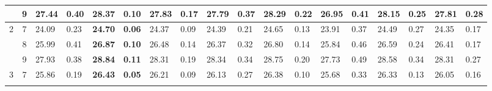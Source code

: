 \documentclass[conference]{IEEEtran}
\begin{document}
\begin{table}[t]
\begin{tabular}{|cc|ll|ll|ll|ll|ll|ll|ll|ll|}
		\multicolumn{1}{|c|}{}                    & 9          & \multicolumn{1}{l|}{27.44}         & 0.40                              & \multicolumn{1}{l|}{\textbf{28.37}} & \textbf{0.10}                     & \multicolumn{1}{l|}{27.83}         & 0.17                              & \multicolumn{1}{l|}{27.79}         & 0.37                              & \multicolumn{1}{l|}{28.29}                & 0.22          & \multicolumn{1}{l|}{26.95} & 0.41 & \multicolumn{1}{l|}{28.15}          & 0.25          & \multicolumn{1}{l|}{27.81} & 0.28 \\ \hline
		\multicolumn{1}{|c|}{\multirow{3}{*}{2}}  & 7          & \multicolumn{1}{l|}{24.09}         & 0.23                              & \multicolumn{1}{l|}{\textbf{24.70}} & \textbf{0.06}                     & \multicolumn{1}{l|}{24.37}         & 0.09                              & \multicolumn{1}{l|}{24.39}         & 0.21                              & \multicolumn{1}{l|}{24.65}                & 0.13          & \multicolumn{1}{l|}{23.91} & 0.37 & \multicolumn{1}{l|}{24.49}          & 0.27          & \multicolumn{1}{l|}{24.35} & 0.17 \\ \cline{2-18} 
		\multicolumn{1}{|c|}{}                    & 8          & \multicolumn{1}{l|}{25.99}         & 0.41                              & \multicolumn{1}{l|}{\textbf{26.87}} & \textbf{0.10}                     & \multicolumn{1}{l|}{26.48}         & 0.14                              & \multicolumn{1}{l|}{26.37}         & 0.32                              & \multicolumn{1}{l|}{26.80}                & 0.14          & \multicolumn{1}{l|}{25.84} & 0.46 & \multicolumn{1}{l|}{26.59}          & 0.24          & \multicolumn{1}{l|}{26.41} & 0.17 \\ \cline{2-18} 
		\multicolumn{1}{|c|}{}                    & 9          & \multicolumn{1}{l|}{27.93}         & 0.38                              & \multicolumn{1}{l|}{\textbf{28.84}} & \textbf{0.11}                     & \multicolumn{1}{l|}{28.31}         & 0.19                              & \multicolumn{1}{l|}{28.34}         & 0.34                              & \multicolumn{1}{l|}{28.75}                & 0.20          & \multicolumn{1}{l|}{27.73} & 0.49 & \multicolumn{1}{l|}{28.58}          & 0.34          & \multicolumn{1}{l|}{28.31} & 0.27 \\ \hline
		\multicolumn{1}{|c|}{\multirow{3}{*}{3}}  & 7          & \multicolumn{1}{l|}{25.86}         & 0.19                              & \multicolumn{1}{l|}{\textbf{26.43}} & \textbf{0.05}                     & \multicolumn{1}{l|}{26.21}         & 0.09                              & \multicolumn{1}{l|}{26.13}         & 0.27                              & \multicolumn{1}{l|}{26.38}                & 0.10          & \multicolumn{1}{l|}{25.68} & 0.33 & \multicolumn{1}{l|}{26.33}          & 0.13          & \multicolumn{1}{l|}{26.05} & 0.16 \\ \cline{2-18} 

\end{tabular}
\end{table}
\end{document}
